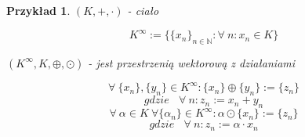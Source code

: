 \documentclass[a5paper,8pt]{article}
\newtheorem{example}{Przykład}[section]
\newtheorem{lemat}{Lemat}[section]
\begin{document}
    \begin{example} \hfill \break
        $ ( K, +, \cdot ) $ - ciało

        \begin{equation*}
            K^\infty := \{ \{x_n\}_{n \in \mathbb{N} } : \forall~n: x_n \in K \}
        \end{equation*}

        $ (K^\infty, K, \oplus, \odot ) $ - jest przestrzenią wektorową z działaniami

        \begin{equation*}
            \forall~\{x_n\}, \{y_n\} \in K^\infty: \{x_n\} \oplus \{y_n\} := \{z_n\}
        \end{equation*}
        \begin{equation*}
            gdzie~~~~ \forall~n: z_n := x_n + y_n
        \end{equation*}
        \begin{equation*}
            \forall~\alpha \in K ~\forall \{\alpha_n\} \in K^\infty :
            \alpha \odot \{x_n\} := \{z_n\}
        \end{equation*}
        \begin{equation*}
            gdzie~~~~ \forall~n: z_n := \alpha \cdot x_n
        \end{equation*}
    \end{example}












\end{document}
